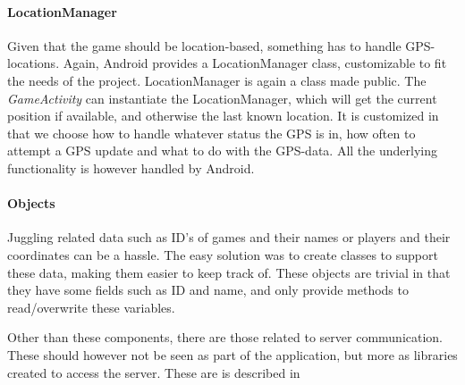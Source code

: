 \paragraph{LocationManager}
Given that the game should be location-based, something has to handle GPS-locations. Again, Android provides a LocationManager class, customizable to fit the needs of the project. LocationManager is again a class made public. The \textit{GameActivity} can instantiate the LocationManager, which will get the current position if available, and otherwise the last known location. It is customized in that we choose how to handle whatever status the GPS is in, how often to attempt a GPS update and what to do with the GPS-data. All the underlying functionality is however handled by Android.

\paragraph{Objects}
Juggling related data such as ID's of games and their names or players and their coordinates can be a hassle. The easy solution was to create classes to support these data, making them easier to keep track of. These objects are trivial in that they have some fields such as ID and name, and only provide methods to read/overwrite these variables.

Other than these components, there are those related to server communication. These should however not be seen as part of the application, but more as libraries created to access the server. These are is described in 
